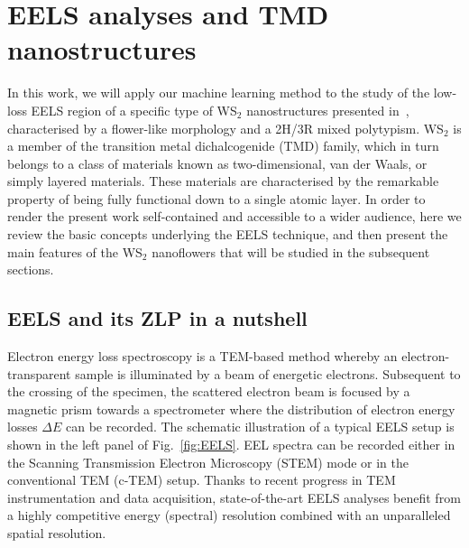 \section{EELS analyses and TMD nanostructures}
\label{sec:tmdeels}

In this work, we will apply our machine learning method to the study
of the low-loss EELS region of a specific type of WS$_2$ nanostructures presented in~\cite{SabryaWS2},
characterised by a flower-like morphology and a 2H/3R mixed polytypism.
%
WS$_2$ is a member of the transition metal dichalcogenide (TMD) family, which in turn
belongs to a class of materials known as two-dimensional, van der Waals, or simply layered materials.
%
These materials are
characterised by the remarkable property of being fully functional down to a single atomic layer.
%
In order to render the present work self-contained and accessible to a wider audience,
here we review the basic concepts underlying  the EELS technique, and then
present the main features of the WS$_2$ nanoflowers that will be studied in the subsequent sections.

\subsection{EELS and its ZLP in a nutshell}
\label{sec:eels}

Electron energy loss spectroscopy is a TEM-based method
whereby an electron-transparent sample is illuminated by a 
beam of energetic electrons.
%
Subsequent to the crossing of
the specimen, the scattered electron beam is focused by a magnetic prism
towards a spectrometer where the distribution of electron energy losses $\Delta E$ can be recorded.
%
The schematic illustration of a typical EELS setup is shown in the left panel of Fig.~\ref{fig:EELS}.
%
EEL spectra can be recorded either in the Scanning Transmission Electron Microscopy (STEM) mode
or in the conventional TEM (c-TEM) setup.
%
Thanks to recent progress in TEM instrumentation and data acquisition, state-of-the-art EELS analyses benefit from
a highly competitive energy (spectral) resolution combined with an unparalleled spatial resolution.

